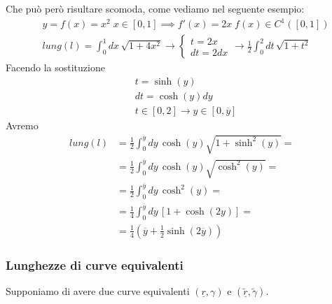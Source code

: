 Che può però risultare scomoda, come vediamo nel seguente esempio:
\begin{align}
{}&y=f(x)=x^2 \; x\in [0,1] \implies f'(x)=2x \; f(x)\in C^1([0,1]) \\ 
&lung(l)= \int_{0}^{1} dx \, \sqrt{1+4x^2} \rightarrow \left\{
\begin{array}{cc}
t=2x \\
dt=2dx
\end{array}
\right. \rightarrow \frac{1}{2}\int_{0}^{2} dt \, \sqrt{1+t^2}
\end{align}
Facendo la sostituzione
\begin{align}
{}&t= \sinh(y)\\
&dt= \cosh(y)dy \\
&t \in [0,2] \rightarrow y \in [0,\overline{y}]
\end{align}
Avremo
\begin{align}
lung(l) {}&= \frac{1}{2} \int_{0}^{\overline{y}} dy \, \cosh(y)\sqrt{1 + \sinh^2(y)}= \nonumber \\
&=\frac{1}{2} \int_{0}^{\overline{y}} dy \, \cosh(y)\sqrt{\cosh^2(y)}= \nonumber \\
&= \frac{1}{2} \int_{0}^{\overline{y}} dy \, \cosh^2(y)= \nonumber \\
&= \frac{1}{4} \int_{0}^{\overline{y}} dy \, [1+\cosh(2y)]= \nonumber \\
&= \frac{1}{4} \left(\overline{y} + \frac{1}{2}\sinh(2\overline{y})\right)
\end{align}

\subsubsection{Lunghezze di curve equivalenti}

Supponiamo di avere due curve equivalenti $(\underline{r},\gamma)$ e $(\tilde{\underline{r}},\tilde{\gamma})$.

